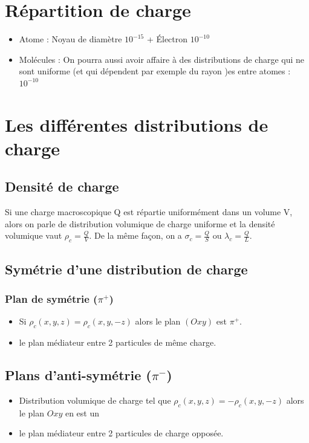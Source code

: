 \documentclass[french]{yLectureNote}
\begin{document}
\section{Répartition de charge}
\begin{itemize}
 \item Atome : Noyau de diamètre \(10^{-15}\) + Électron \(10^{-10}\)
 \item Molécules : On pourra aussi avoir affaire à des distributions de charge qui ne sont uniforme (et qui dépendent par exemple du rayon )es entre atomes  :  \(10^{-10}\)
\end{itemize}
\section{Les différentes distributions de charge}
\subsection{Densité de charge}
\begin{definition}
Si une charge macroscopique Q est répartie uniformément dans un volume V, alors on parle de distribution volumique de charge uniforme et la densité volumique vaut \(\rho_c = \frac{Q}{V}\). De la m\^eme façon, on a \(\sigma_c = \frac{Q}{S}\) ou \(\lambda_c = \frac{Q}{L}\).
\end{definition}
\subsection{Symétrie d'une distribution de charge}
\subsubsection{Plan de symétrie (\(\pi^+\))}
\begin{itemize}
 \item Si \(\rho_c(x,y,z) = \rho_c(x,y,-z)\) alors le plan \((Oxy)\) est \(\pi^+\).
 \item le plan médiateur entre 2 particules de m\^eme charge.
\end{itemize}
\subsection{Plans d'anti-symétrie (\(\pi^-\))}
\begin{itemize}
 \item Distribution volumique de charge tel que \(\rho_c(x,y,z) = -\rho_c(x,y,-z)\) alors le plan \(Oxy\) en est un
 \item le plan médiateur entre 2 particules de charge opposée.
\end{itemize}
\end{document}
